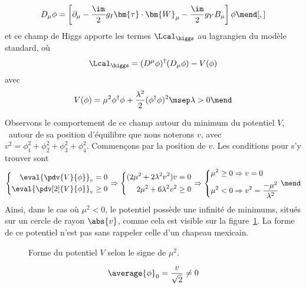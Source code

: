\begin{equation}
D_\mu \phi = \left[ \partial_\mu - \frac{\im}{2}g_I \bm{\tau}\cdot\bm{W}_\mu - \frac{\im}{2}g_YB_\mu \right] \phi
\mend[,]
\end{equation}
et ce champ de Higgs apporte les termes $\Lcal_{\higgs}$ au lagrangien du modèle standard, où
\begin{equation}
\Lcal_{\higgs} = (D^\mu\phi)^\dagger(D_\mu\phi) - V(\phi)
\end{equation}
avec
\begin{equation}
V(\phi)
= \mu^2\phi^\dagger\phi + \frac{\lambda^2}{2} (\phi^\dagger\phi)^2
\msep \lambda > 0
\mend
\end{equation}
\par Observons le comportement de ce champ autour du minimum du potentiel $V$, \ie\ autour de sa position d'équilibre que nous noterons $v$, avec $v^2=\phi_1^2+\phi_2^2+\phi_3^2+\phi_4^2$.
Commençons par la position de $v$. Les conditions pour s'y trouver sont
\begin{equation}
\left\lbrace
\begin{aligned}
\eval{\pdv{V}{\phi}}_v=0
\\
\eval{\pdv[2]{V}{\phi}}_v\geq0
\end{aligned}
\right.
\Rightarrow
\left\lbrace
\begin{aligned}
(2\mu^2 + 2\lambda^2 v^2)v = 0
\\
2\mu^2 + 6\lambda^2 v^2 \geq0
\end{aligned}
\right.
\Rightarrow
\left\lbrace
\begin{aligned}
\mu^2 \geq 0 &\Rightarrow v = 0
\\
\mu^2 < 0 &\Rightarrow v^2 = \frac{-\mu^2}{\lambda^2}
\end{aligned}
\right.
\mend
\end{equation}
Ainsi, dans le cas où $\mu^2<0$, le potentiel possède une infinité de minimums, situés sur un cercle de rayon $\abs{v}$, comme cela est visible sur la figure~\ref{fig-rpztation_3d_V_Higgs}. La forme de ce potentiel n'est pas sans rappeler celle d'un chapeau mexicain.
\begin{figure}[h]
\centering

\caption{Forme du potentiel $V$ selon le signe de $\mu^2$.}
\label{fig-rpztation_3d_V_Higgs}
\end{figure}
\par {}
\begin{equation}
\average{\phi}_0 = \frac{v}{\sqrt{2}} \neq 0
\end{equation}
